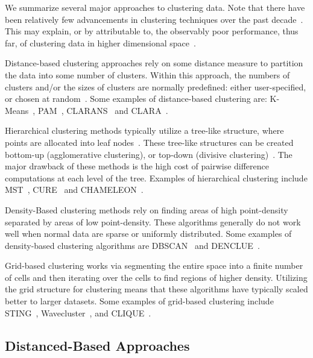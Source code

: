 We summarize several major approaches to clustering data.
Note that there have been relatively few advancements in clustering techniques over the past decade~\cite{wang2019progress}. This may explain, or by attributable to, the observably poor performance, thus far, of clustering data in higher dimensional space~\cite{zhang2013advancements}.

Distance-based clustering approaches rely on some distance measure to partition the data into some number of clusters.
Within this approach, the numbers of clusters and/or the sizes of clusters are normally predefined: either user-specified, or chosen at random~\cite{wang2019progress}.
Some examples of distance-based clustering are:
K-Means~\cite{macqueen1967some}, 
PAM~\cite{kaufman2009finding}, 
CLARANS~\cite{ng1994efficient} and
CLARA~\cite{kaufman2009finding}.

Hierarchical clustering methods typically utilize a tree-like structure, where points are allocated into leaf nodes~\cite{wang2019progress}.
These tree-like structures can be created bottom-up (agglomerative clustering), or top-down (divisive clustering)~\cite{agrawal1998automatic}.
The major drawback of these methods is the high cost of pairwise difference computations at each level of the tree.
Examples of hierarchical clustering include 
MST~\cite{charles_zahn_graph_1971}, 
CURE~\cite{guha1998cure} and
CHAMELEON~\cite{karypis1999hierarchical}.

Density-Based clustering methods rely on finding areas of high point-density separated by areas of low point-density.
These algorithms generally do not work well when normal data are sparse or uniformly distributed.
Some examples of density-based clustering algorithms are
DBSCAN~\cite{ester1996density} and
DENCLUE~\cite{hinneburg1998efficient}.

Grid-based clustering works via segmenting the entire space into a finite number of cells and then iterating over the cells to find regions of higher density.
Utilizing the grid structure for clustering means that these algorithms have typically scaled better to larger datasets.
Some examples of grid-based clustering include
STING~\cite{wang1997sting}, 
Wavecluster~\cite{sheikholeslami2000wavecluster}, and
CLIQUE~\cite{agrawal1998automatic}.

\subsection{Distanced-Based Approaches}

